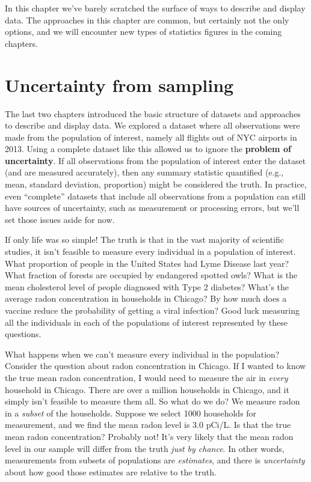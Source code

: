 \documentclass[
]{book}
\begin{document}
In this chapter we've barely scratched the surface of ways to describe and display data. The approaches in this chapter are common, but certainly not the only options, and we will encounter new types of statistics figures in the coming chapters.

\chapter{Uncertainty from sampling}\label{uncertainty-from-sampling}

The last two chapters introduced the basic structure of datasets and approaches to describe and display data. We explored a dataset where all observations were made from the population of interest, namely all flights out of NYC airports in 2013. Using a complete dataset like this allowed us to ignore the \textbf{problem of uncertainty}. If all observations from the population of interest enter the dataset (and are measured accurately), then any summary statistic quantified (e.g., mean, standard deviation, proportion) might be considered the truth. In practice, even ``complete'' datasets that include all observations from a population can still have sources of uncertainty, such as measurement or processing errors, but we'll set those issues aside for now.

If only life was so simple! The truth is that in the vast majority of scientific studies, it isn't feasible to measure every individual in a population of interest. What proportion of people in the United States had Lyme Disease last year? What fraction of forests are occupied by endangered spotted owls? What is the mean cholesterol level of people diagnosed with Type 2 diabetes? What's the average radon concentration in households in Chicago? By how much does a vaccine reduce the probability of getting a viral infection? Good luck measuring all the individuals in each of the populations of interest represented by these questions.

What happens when we can't measure every individual in the population? Consider the question about radon concentration in Chicago. If I wanted to know the true mean radon concentration, I would need to measure the air in \emph{every} household in Chicago. There are over a million households in Chicago, and it simply isn't feasible to measure them all. So what do we do? We measure radon in a \emph{subset} of the households. Suppose we select 1000 households for measurement, and we find the mean radon level is 3.0 pCi/L. Is that the true mean radon concentration? Probably not! It's very likely that the mean radon level in our sample will differ from the truth \emph{just by chance}. In other words, measurements from subsets of populations are \emph{estimates}, and there is \emph{uncertainty} about how good those estimates are relative to the truth.
\end{document}
